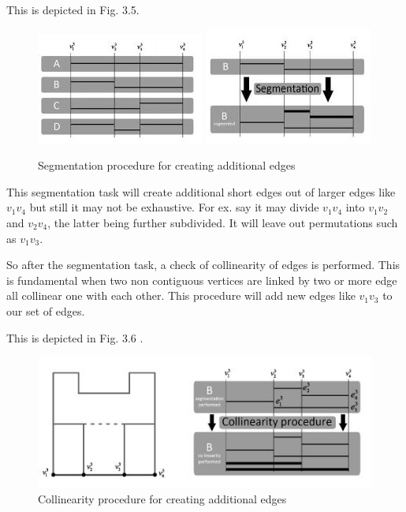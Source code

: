 \documentclass[a4paper,11pt,openany]{book}
\begin{document}
This is depicted in Fig. 3.5. 

\begin{figure}[ht]
\centering
\includegraphics[scale=0.9]{possibleCombinationEdges}
\includegraphics[scale=0.9]{Segmentation}
\caption{Segmentation procedure for creating additional edges}
\end{figure}

This segmentation task will create additional short edges out of larger edges like $v_1v_4$ but still it may not be exhaustive. For ex. say it may divide $v_1v_4$ into $v_1v_2$ and $v_2v_4$, the latter being further subdivided. It will leave out permutations such as $v_1v_3$. 

So after the segmentation task, a check of collinearity of edges is performed. This is fundamental when two non contiguous vertices are linked by two or more edge all collinear one with each other. This procedure will add new edges like $v_1v_3$ to our set of edges.

This is depicted in Fig. 3.6 .
\begin{figure}[ht]
\centering
\includegraphics[scale=0.9]{Collinearity}
\caption{Collinearity procedure for creating additional edges}
\end{figure}
\end{document}
